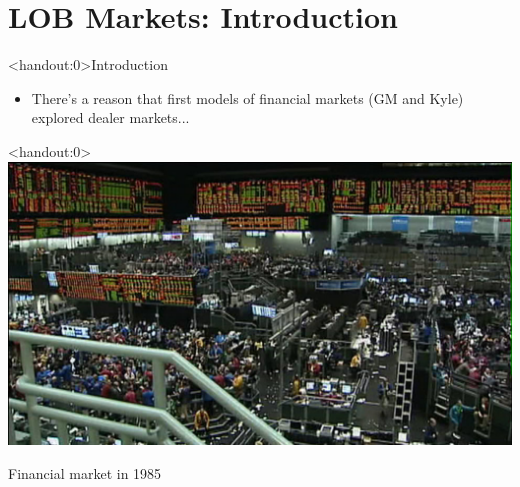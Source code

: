 \documentclass[english,10pt
,aspectratio=169
]{beamer}
\begin{document}



\section{LOB Markets: Introduction}

\begin{frame}<handout:0>{Introduction}
	\begin{itemize}
		\item There's a reason that first models of financial markets (GM and Kyle) explored dealer markets...
	\end{itemize}
\end{frame}


\begin{frame}<handout:0>
	\centering
	\includegraphics[scale=0.5]{pics/mkt20}
	
	Financial market in 1985
\end{frame}
\end{document}
